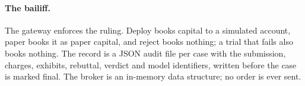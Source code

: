 \paragraph{The bailiff.}
The gateway enforces the ruling. Deploy books capital to a simulated account, paper books it as paper capital, and reject books nothing; a trial that fails also books nothing. %
The record is a JSON audit file per case with the submission, charges, exhibits, rebuttal, verdict and model identifiers, written before the case is marked final. %
The broker is an in-memory data structure; no order is ever sent.
